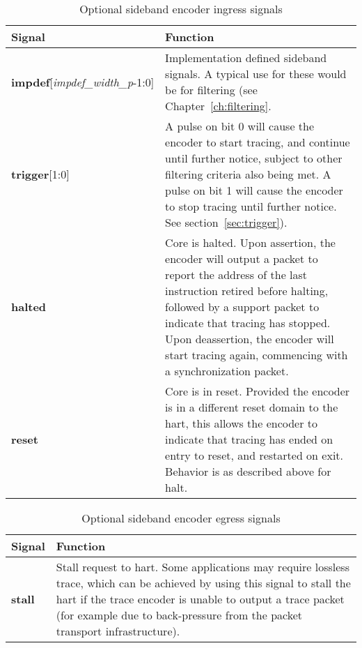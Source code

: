 \begin{table}[htp]
    \centering
    \caption{Optional sideband encoder ingress signals}
    \label{tab:ingress-side-band}
    \begin{tabulary}{\textwidth}{|l|p{100mm}|}
        \hline
        \textbf{Signal} & \textbf{Function} \\
        \hline
        \textbf{impdef}[\textit{impdef\_width\_p}-1:0] &  Implementation defined sideband signals.  A typical use for
        these would be for filtering (see Chapter~\ref{ch:filtering}.\\
        \hline
        \textbf{trigger}[1:0] & A pulse on bit 0 will cause the encoder to start tracing, and continue until further 
        notice, subject to other filtering criteria also being met.\newline
        A pulse on bit 1 will cause the encoder to stop tracing until further notice.  See section~\ref{sec:trigger}).\\
        \hline
        \textbf{halted}& Core is halted.  Upon assertion, the encoder will output a packet to report the address 
        of the last instruction retired before halting, followed by a support packet to indicate that tracing has stopped. 
        Upon deassertion, the encoder will start tracing again, commencing with a synchronization packet.\\
        \hline
        \textbf{reset}& Core is in reset.  Provided the encoder is in a different reset domain to the hart, this
        allows the encoder to indicate that tracing has ended on entry to reset, and restarted on exit.  
        Behavior is as described above for halt.\\
        \hline
    \end{tabulary}
\end{table}

\begin{table}[htp]
    \centering
    \caption{Optional sideband encoder egress signals}
    \label{tab:egress-side-band}
    \begin{tabulary}{\textwidth}{|l|p{130mm}|}
        \hline
        \textbf{Signal} & \textbf{Function} \\
        \hline
        \textbf{stall}& Stall request to hart.  Some applications may require lossless trace, which can be achieved by
        using this signal to stall the hart if the trace encoder is unable to output a trace packet (for example due to 
        back-pressure from the packet transport infrastructure).\\
        \hline
    \end{tabulary}
\end{table}

